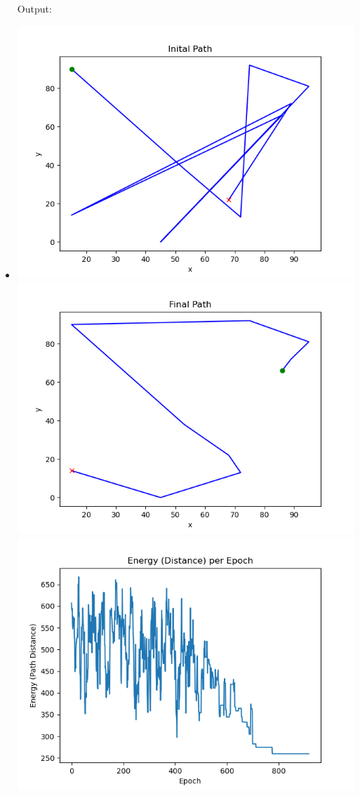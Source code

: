 \documentclass[a4paper,10pt]{article}
\begin{document}
\begin{itemize}
  Output:
  \item \includegraphics[scale=0.5]{latexGraphs/1_inital_path.png}
\includegraphics[scale=0.5]{latexGraphs/1_final_path.png}
\includegraphics[scale=0.5]{latexGraphs/1_energy.png}



\end{itemize}
\end{document}
